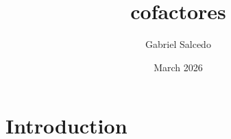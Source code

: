 \documentclass{article}
\title{cofactores}
\author{Gabriel Salcedo}
\date{March 2026}
\begin{document}
\maketitle

\section{Introduction}
\end{document}
